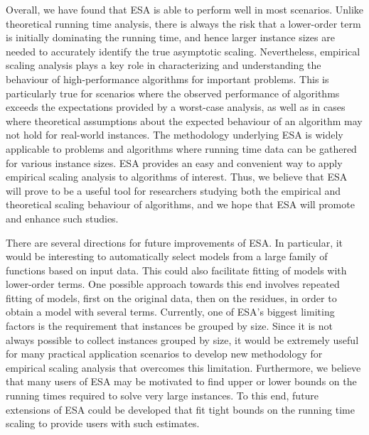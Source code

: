 \documentclass[aic]{iosart2x}
\begin{document}
Overall, we have found that ESA is able to perform well in most scenarios. 
Unlike theoretical running time analysis, there is always the risk that a lower-order term is initially dominating the running time, and hence larger instance sizes are needed to accurately identify the true asymptotic scaling. Nevertheless, empirical scaling analysis plays a key role in characterizing and understanding the behaviour of high-performance algorithms for important problems. 
This is particularly true for scenarios where the observed performance of algorithms exceeds the expectations provided by a worst-case analysis, as well as in cases where theoretical assumptions about the expected behaviour of an algorithm may not hold for real-world instances. 
The methodology underlying ESA is widely applicable to problems and algorithms where running time data can be gathered for various instance sizes. 
ESA provides an easy and convenient way to apply empirical scaling analysis to algorithms of interest. 
Thus, we believe that ESA will prove to be a useful tool for researchers studying both the empirical and theoretical scaling behaviour of algorithms, and we hope that ESA will promote and enhance such studies.

There are several directions for future improvements of ESA. 
In particular, it would be interesting to automatically select models from a large family of functions based on input data. 
This could also facilitate fitting of models with lower-order terms. 
One possible approach towards this end involves repeated fitting of models, first on the original data, then on the residues, in order to obtain a model with several terms. %
Currently, one of ESA's biggest limiting factors is the requirement that instances be grouped by size. 
Since it is not always possible to collect instances grouped by size, it would be extremely useful for many practical application scenarios to develop new methodology for empirical scaling analysis that overcomes this limitation.
Furthermore, we believe that many users of ESA may be motivated to find upper or lower bounds on the running times required to solve very large instances. 
To this end, future extensions of ESA could be developed that fit tight bounds on the running time scaling to provide users with such estimates.
\end{document}
